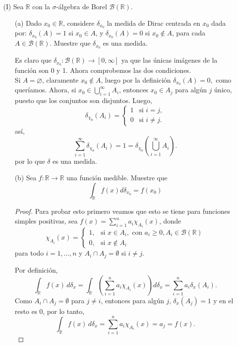  \begin{itemize}
  
\item[(I)] Sea $\mathbb{R}$ con la $\sigma$-álgebra de Borel $\mathcal{B}(\mathbb{R})$.
\begin{itemize}
\item[(a)] Dado $x_0 \in \mathbb{R}$, considere $\delta_{x_0}$ la medida de Dirac centrada en $x_0$ dada por: $\delta_{x_0}(A)=1$ si $x_0 \in A$, y $\delta_{x_0}(A)=0$ si $x_0 \notin A$, para cada $A \in \mathcal{B}(\mathbb{R})$. Muestre que $\delta_{x_0}$ es una medida.
\begin{sproof}
    Es claro que $\delta_{x_0}:\mathcal{B}(\mathbb{R})\to [0,\infty]$ ya que las únicas imágenes de la función son 0 y 1. Ahora comprobemos las dos condiciones.\\

    Si $A=\varnothing$, claramente $x_0\notin A$, luego por la definición $\delta_{x_0}(A)=0,$ como queríamos.
Ahora, si \(x_0 \in \bigcup_{i=1}^{\infty} A_i\), entonces \(x_0 \in A_j\) para algún \(j\) único, puesto que los conjuntos son disjuntos. Luego, 
\[
\delta_{\chi_0}(A_i) = 
\begin{cases}
1 & \text{si } i = j, \\
0 & \text{si } i \neq j.
\end{cases}
\]
así,
\[
\sum_{i=1}^{\infty} \delta_{\chi_0}(A_i) = 1 = \delta_{\chi_0}\left(\bigcup_{i=1}^{\infty} A_i\right).
\]
por lo que $\delta$ es una medida.
\end{sproof}
\item[(b)] Sea $f: \mathbb{R} \rightarrow \mathbb{R}$ una función medible. Muestre que
$$
\int_{\mathbb{R}} f(x) d \delta_{x_0}=f\left(x_0\right)
$$
\begin{proof}
Para probar esto primero veamos que esto se tiene para funciones simples positivas, sea \( f(x) = \sum_{i=1}^n a_i \chi_{A_i}(x) \), donde 
\[
\chi_{A_i}(x) = \begin{cases} 
1, & \text{si } x \in A_i, \text{ con } a_i \geq 0, A_i \in \mathcal{B}(\mathbb{R}) \\
0, & \text{si } x \notin A_i
\end{cases}
\]
para todo \( i = 1,\dots,n \) y \( A_i \cap A_j = \emptyset \) si \( i \neq j \).

Por definición,
\[
\int_{\mathbb{R}} f(x) \, d\delta_x = \int_{\mathbb{R}} \left( \sum_{i=1}^n a_i \chi_{A_i}(x) \right) d\delta_x = \sum_{i=1}^n a_i \delta_x(A_i).
\]
Como \( A_i \cap A_j = \emptyset \) para \( j \neq i \), entonces para algún \( j \), \( \delta_x(A_j) = 1 \) y en el resto es \( 0 \), por lo  tanto,
\[
\int_{\mathbb{R}} f(x) \, d\delta_x = \sum_{i=1}^n a_i \chi_{A_i}(x)= a_j  = f(x).
\]


\end{proof}
\end{itemize}
\end{itemize}
